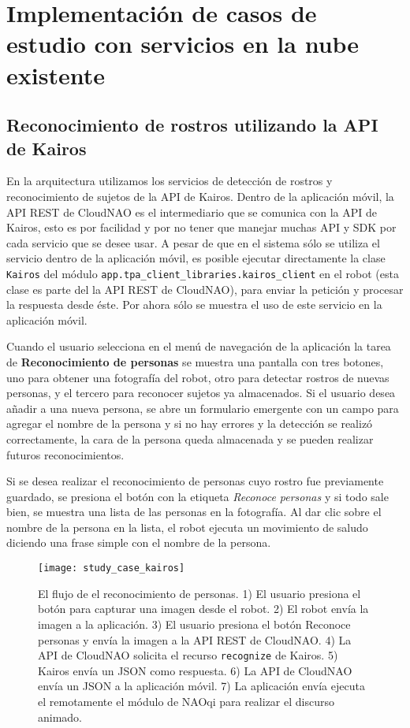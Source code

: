 
\section{Implementación de casos de estudio con servicios en la nube existente}
\label{\detokenize{chapter_two/study_cases_implementation:implementacion-de-casos-de-estudio-con-servicios-en-la-nube-existente}}\label{\detokenize{chapter_two/study_cases_implementation::doc}}


\subsection{Reconocimiento de rostros utilizando la API de Kairos}

En la arquitectura utilizamos los servicios de detección de rostros y reconocimiento
de sujetos de la API de Kairos.
Dentro de la aplicación móvil, la API REST de CloudNAO es el intermediario
que se comunica con la API de Kairos, esto es por facilidad y por no
tener que manejar muchas API y SDK por cada servicio que se desee usar.
A pesar de que en el sistema sólo se utiliza el servicio
dentro de la aplicación móvil, es posible ejecutar directamente la clase
\texttt{Kairos} del módulo \texttt{app.tpa\_client\_libraries.kairos\_client}
en el robot (esta clase es parte del la API REST de CloudNAO), para enviar la petición y procesar la respuesta desde éste.
Por ahora sólo se muestra el uso de este servicio en la aplicación móvil.

Cuando el usuario selecciona en el menú de navegación de la aplicación
la tarea de \textbf{Reconocimiento de personas} se muestra una pantalla 
con tres botones, uno para obtener una fotografía del robot, otro para
detectar rostros de nuevas personas, y el tercero para reconocer sujetos
ya almacenados. Si el usuario desea añadir a una nueva persona, se abre un
formulario emergente con un campo para agregar el nombre de la persona y
si no hay errores y la detección se realizó correctamente,
la cara de la persona queda almacenada y se pueden realizar futuros reconocimientos.

Si se desea realizar el reconocimiento de personas cuyo rostro
fue previamente guardado, se presiona el botón con la etiqueta
\textit{Reconoce personas} y si todo sale bien,
se muestra una lista de las personas en la fotografía.
Al dar clic sobre el nombre de la persona en la lista, el robot ejecuta
un movimiento de saludo diciendo una frase simple con el nombre de la persona.

\begin{figure}[htbp]
\centering
\caption{El flujo de el reconocimiento de personas. 1) El usuario presiona el botón para capturar una imagen desde el robot. 2) El robot envía la imagen a la 
aplicación. 3) El usuario presiona el botón Reconoce personas y envía la imagen a la API REST de CloudNAO. 4) La API de CloudNAO solicita el recurso \texttt{recognize} de Kairos. 5) Kairos envía un JSON como respuesta. 6) La API 
de CloudNAO envía un JSON a la aplicación móvil. 7) La aplicación envía ejecuta el remotamente el módulo de NAOqi para realizar el discurso animado.}
\texttt{[image: study\_case\_kairos]}
\end{figure}

